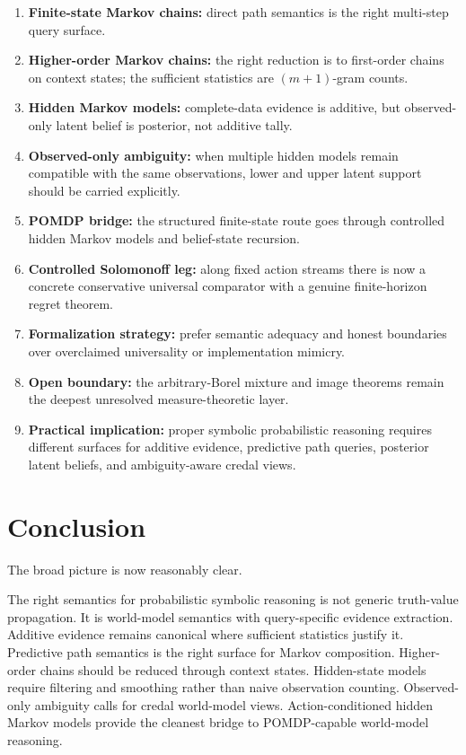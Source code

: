 \documentclass[11pt]{article}
\begin{document}
\begin{enumerate}
  \item \textbf{Finite-state Markov chains:} direct path semantics is the right
        multi-step query surface.
  \item \textbf{Higher-order Markov chains:} the right reduction is to
        first-order chains on context states; the sufficient statistics are
        $(m+1)$-gram counts.
  \item \textbf{Hidden Markov models:} complete-data evidence is additive, but
        observed-only latent belief is posterior, not additive tally.
  \item \textbf{Observed-only ambiguity:} when multiple hidden models remain
        compatible with the same observations, lower and upper latent support
        should be carried explicitly.
  \item \textbf{POMDP bridge:} the structured finite-state route goes through
        controlled hidden Markov models and belief-state recursion.
  \item \textbf{Controlled Solomonoff leg:} along fixed action streams there is
        now a concrete conservative universal comparator with a genuine
        finite-horizon regret theorem.
  \item \textbf{Formalization strategy:} prefer semantic adequacy and honest
        boundaries over overclaimed universality or implementation mimicry.
  \item \textbf{Open boundary:} the arbitrary-Borel mixture and image
        theorems remain the deepest unresolved measure-theoretic layer.
  \item \textbf{Practical implication:} proper symbolic probabilistic reasoning
        requires different surfaces for additive evidence, predictive path
        queries, posterior latent beliefs, and ambiguity-aware credal views.
\end{enumerate}

\section{Conclusion}

The broad picture is now reasonably clear.

The right semantics for probabilistic symbolic reasoning is not generic
truth-value propagation.  It is world-model semantics with query-specific
evidence extraction.  Additive evidence remains canonical where sufficient
statistics justify it.  Predictive path semantics is the right surface for
Markov composition.  Higher-order chains should be reduced through context
states.  Hidden-state models require filtering and smoothing rather than naive
observation counting.  Observed-only ambiguity calls for credal world-model
views.  Action-conditioned hidden Markov models provide the cleanest bridge to
POMDP-capable world-model reasoning.
\end{document}
